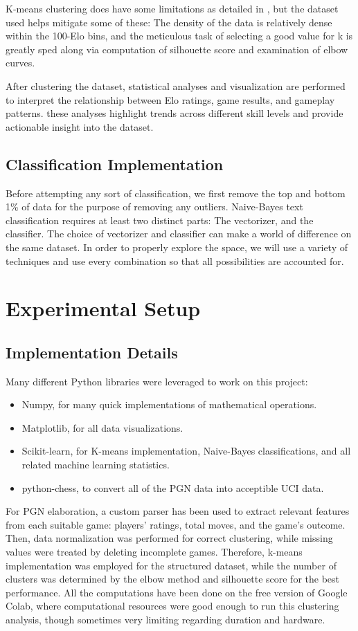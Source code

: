 \documentclass[conference]{IEEEtran}
\begin{document}
K-means clustering does have some limitations as detailed in \cite{b4}, but the dataset used helps mitigate some of these: The density of the data is relatively dense within the 100-Elo bins, and the meticulous task of selecting a good value for k is greatly sped along via computation of silhouette score and examination of elbow curves.

After clustering the dataset, statistical analyses and visualization are performed to interpret the relationship between Elo ratings, game results, and gameplay patterns. these analyses highlight trends across different skill levels and provide actionable insight into the dataset.
\subsection{Classification Implementation}

Before attempting any sort of classification, we first remove the top and bottom 1\% of data for the purpose of removing any outliers.  Naive-Bayes text classification requires at least two distinct parts: The vectorizer, and the classifier. The choice of vectorizer and classifier can make a world of difference on the same dataset. In order to properly explore the space, we will use a variety of techniques and use every combination so that all possibilities are accounted for.

\section{Experimental Setup}

\subsection{Implementation Details}
Many different Python libraries were leveraged to work on this project:
\begin{itemize}
\item Numpy, for many quick implementations of mathematical operations.
\item Matplotlib, for all data visualizations.
\item Scikit-learn, for K-means implementation, Naive-Bayes classifications, and all related machine learning statistics.
\item python-chess, to convert all of the PGN data into acceptible UCI data.
\end{itemize}

For PGN elaboration, a custom parser has been used to extract relevant features from each suitable game: players' ratings, total moves, and the game's outcome. Then, data normalization was performed for correct clustering, while missing values were treated by deleting incomplete games. Therefore, k-means implementation was employed for the structured dataset, while the number of clusters was determined by the elbow method and silhouette score for the best performance. All the computations have been done on the free version of Google Colab, where computational resources were good enough to run this clustering analysis, though sometimes very limiting regarding duration and hardware.
\end{document}
